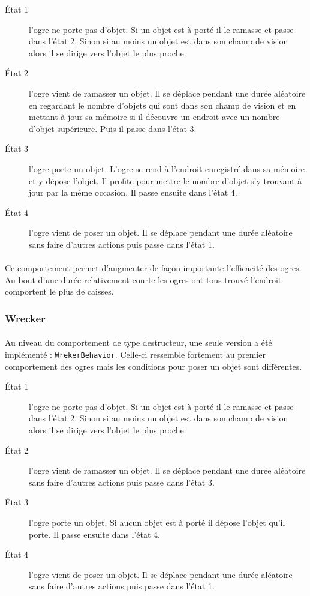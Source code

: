 \begin{description}
    \item[\'Etat 1] l'ogre ne porte pas d'objet. Si un objet est à porté il
        le ramasse et passe dans l'état 2. Sinon si au moins un objet est dans son
        champ de vision alors il se dirige vers l'objet le plus proche.
    \item[\'Etat 2] l'ogre vient de ramasser un objet. Il se déplace pendant une
        durée aléatoire en regardant le nombre d'objets qui sont dans son
        champ de vision et en mettant à jour sa mémoire si il découvre un
        endroit avec un nombre d'objet supérieure. Puis il passe dans l'état 3.
    \item[\'Etat 3] l'ogre porte un objet. L'ogre se rend à l'endroit
        enregistré dans sa mémoire et y dépose l'objet. Il profite pour mettre
        le nombre d'objet s'y trouvant à jour par la même occasion. Il passe
        ensuite dans l'état 4.
    \item[\'Etat 4] l'ogre vient de poser un objet. Il se déplace pendant une
        durée aléatoire sans faire d'autres actions puis passe dans l'état 1.
\end{description}

\paragraph{}Ce comportement permet d'augmenter de façon importante l'efficacité
des ogres. Au bout d'une durée relativement courte les ogres ont tous trouvé
l'endroit comportent le plus de caisses.

\subsubsection{Wrecker}
\paragraph{}Au niveau du comportement de type destructeur, une seule version a
été implémenté : \texttt{WrekerBehavior}. Celle-ci ressemble fortement au premier comportement des
ogres mais les conditions pour poser un objet sont différentes.

\begin{description}
    \item[\'Etat 1] l'ogre ne porte pas d'objet. Si un objet est à porté il
        le ramasse et passe dans l'état 2. Sinon si au moins un objet est dans son
        champ de vision alors il se dirige vers l'objet le plus proche.
    \item[\'Etat 2] l'ogre vient de ramasser un objet. Il se déplace pendant une
        durée aléatoire sans faire d'autres actions puis passe dans l'état 3.
    \item[\'Etat 3] l'ogre porte un objet. Si aucun objet est à porté il
        dépose l'objet qu'il porte. Il passe ensuite dans
        l'état 4.
    \item[\'Etat 4] l'ogre vient de poser un objet. Il se déplace pendant une
        durée aléatoire sans faire d'autres actions puis passe dans l'état 1.
\end{description}

